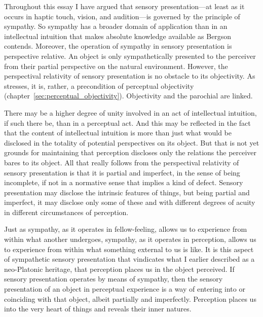 Throughout this essay I have argued that sensory presentation---at least as it occurs in haptic touch, vision, and audition---is governed by the principle of sympathy. So sympathy has a broader domain of application than in an intellectual intuition that makes absolute knowledge available as Bergson contends. Moreover, the operation of sympathy in sensory presentation is perspective relative. An object is only sympathetically presented to the perceiver from their partial perspective on the natural environment. However, the perspectival relativity of sensory presentation is no obstacle to its objectivity. As \citet{Merleau-Ponty:1967fj} stresses, it is, rather, a precondition of perceptual objectivity (chapter~\ref{sec:perceptual_objectivity}). Objectivity and the parochial are linked. 


There may be a higher degree of unity involved in an act of intellectual intuition, if such there be, than in a perceptual act. And this may be reflected in the fact that the content of intellectual intuition is more than just what would be disclosed in the totality of potential perspectives on its object. But that is not yet grounds for maintaining that perception discloses only the relations the perceiver bares to its object. All that really follows from the perspectival relativity of sensory presentation is that it is partial and imperfect, in the sense of being incomplete, if not in a normative sense that implies a kind of defect. Sensory presentation may disclose the intrinsic features of things, but being partial and imperfect, it may disclose only some of these and with different degrees of acuity in different circumstances of perception.

Just as sympathy, as it operates in fellow-feeling, allows us to experience from within what another undergoes, sympathy, as it operates in perception, allows us to experience from within what something external to us is like. It is this aspect of sympathetic sensory presentation that vindicates what I earlier described as a neo-Platonic heritage, that perception places us in the object perceived. If sensory presentation operates by means of sympathy, then the sensory presentation of an object in perceptual experience is a way of entering into or coinciding with that object, albeit partially and imperfectly. Perception places us into the very heart of things and reveals their inner natures.

